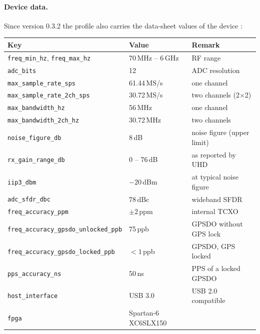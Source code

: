 \paragraph*{Device data.} Since version 0.3.2 the profile also carries the
data-sheet values of the device \cite{ettus_b210,ettus_gpsdo}:
\begin{center}
\small
\begin{tabular}{@{}ll>{\raggedright\arraybackslash}p{3.3cm}@{}}
\toprule
Key & Value & Remark \\
\midrule
\texttt{freq\_min\_hz}, \texttt{freq\_max\_hz} & 70\,MHz -- 6\,GHz & RF range \\
\texttt{adc\_bits} & 12 & ADC resolution \\
\texttt{max\_sample\_rate\_sps} & 61.44\,MS/s & one channel \\
\texttt{max\_sample\_rate\_2ch\_sps} & 30.72\,MS/s & two channels (2$\times$2) \\
\texttt{max\_bandwidth\_hz} & 56\,MHz & one channel \\
\texttt{max\_bandwidth\_2ch\_hz} & 30.72\,MHz & two channels \\
\texttt{noise\_figure\_db} & 8\,dB & noise figure (upper limit) \\
\texttt{rx\_gain\_range\_db} & 0 -- 76\,dB & as reported by UHD \\
\texttt{iip3\_dbm} & $-20$\,dBm & at typical noise figure \\
\texttt{adc\_sfdr\_dbc} & 78\,dBc & wideband SFDR \\
\texttt{freq\_accuracy\_ppm} & $\pm 2$\,ppm & internal TCXO \\
\texttt{freq\_accuracy\_gpsdo\_unlocked\_ppb} & 75\,ppb & GPSDO without GPS lock \\
\texttt{freq\_accuracy\_gpsdo\_locked\_ppb} & $< 1$\,ppb & GPSDO, GPS locked \\
\texttt{pps\_accuracy\_ns} & 50\,ns & PPS of a locked GPSDO \\
\texttt{host\_interface} & USB 3.0 & USB 2.0 compatible \\
\texttt{fpga} & Spartan-6 XC6SLX150 & \\
\bottomrule
\end{tabular}
\end{center}

